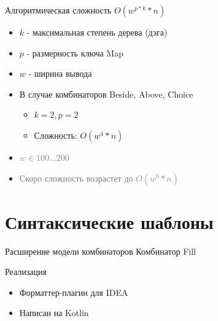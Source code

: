\documentclass[sans]{beamer}
\begin{document}
\begin{frame}{Алгоритмическая сложность}
  $O(w^{p * k} * n)$
  \begin{itemize}
    \item $k$ - максимальная степень дерева (дэга)
    \item $p$ - размерность ключа Map
    \item $w$ - ширина вывода
    \item В случае комбинаторов Beside, Above, Choice
    \begin{itemize}
      \item $k = 2, p = 2$
      \item Сложность: $O(w^4 * n)$ 
    \end{itemize}

    \item \textcolor{gray}{$w \in 100\dots200$}
    \item \textcolor{gray}{Скоро сложность возрастет до $O(w ^ 6 * n)$ }
 
  \end{itemize}
\end{frame}

\section{Синтаксические шаблоны}

\begin{frame}{Расширение модели комбинаторов}
  Комбинатор Fill
\end{frame}

\begin{frame}{Реализация}
  \begin{itemize}
    \item Форматтер-плагин для IDEA
    \item Написан на Kotlin
  \end{itemize}
\end{frame}
\end{document}
